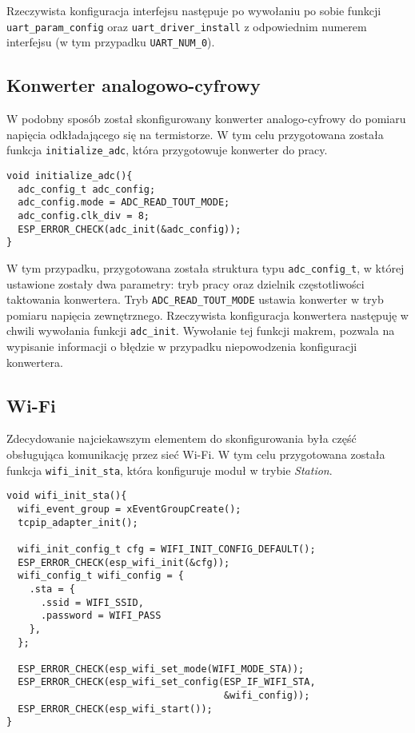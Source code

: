 Rzeczywista konfiguracja interfejsu następuje po wywołaniu po sobie funkcji \verb+uart_param_config+ oraz
\verb+uart_driver_install+ z odpowiednim numerem interfejsu (w tym przypadku \verb+UART_NUM_0+).
\newpage

\subsection{Konwerter analogowo-cyfrowy}
\label{projekt_adc}

W podobny sposób został skonfigurowany konwerter analogo-cyfrowy do pomiaru napięcia odkładającego
się na termistorze. W tym celu przygotowana została funkcja \verb+initialize_adc+, która przygotowuje 
konwerter do pracy.

\begin{lstlisting}[style=customc,
    frame=single,
    caption={Konfiguracja ADC},
    captionpos=b,
    label={esptool_basic}]
void initialize_adc(){
  adc_config_t adc_config;
  adc_config.mode = ADC_READ_TOUT_MODE;
  adc_config.clk_div = 8;
  ESP_ERROR_CHECK(adc_init(&adc_config));
}
\end{lstlisting}

W tym przypadku, przygotowana została struktura typu \verb+adc_config_t+,
 w której ustawione zostały 
dwa parametry: tryb pracy oraz dzielnik częstotliwości taktowania konwertera. 
Tryb \verb+ADC_READ_TOUT_MODE+
ustawia konwerter w tryb pomiaru napięcia zewnętrznego. Rzeczywista 
konfiguracja konwertera następuję
w chwili wywołania funkcji \verb+adc_init+. Wywołanie tej funkcji 
makrem, pozwala na wypisanie informacji
o błędzie w przypadku niepowodzenia konfiguracji konwertera.


\subsection{Wi-Fi}
\label{projekt_wifi}

Zdecydowanie najciekawszym elementem do skonfigurowania była część 
obsługująca komunikację przez sieć Wi-Fi. W tym celu przygotowana została
funkcja \verb+wifi_init_sta+, która konfiguruje moduł w trybie \textit{Station}.\\

\begin{lstlisting}[style=customc,
    frame=single,
    caption={Konfiguracja Wi-Fi},
    captionpos=b,
    label={esptool_basic}]
void wifi_init_sta(){
  wifi_event_group = xEventGroupCreate();
  tcpip_adapter_init();

  wifi_init_config_t cfg = WIFI_INIT_CONFIG_DEFAULT();
  ESP_ERROR_CHECK(esp_wifi_init(&cfg));
  wifi_config_t wifi_config = {
    .sta = {
      .ssid = WIFI_SSID,
      .password = WIFI_PASS
    },
  };

  ESP_ERROR_CHECK(esp_wifi_set_mode(WIFI_MODE_STA));
  ESP_ERROR_CHECK(esp_wifi_set_config(ESP_IF_WIFI_STA, 
                                      &wifi_config));
  ESP_ERROR_CHECK(esp_wifi_start());
}
\end{lstlisting}

